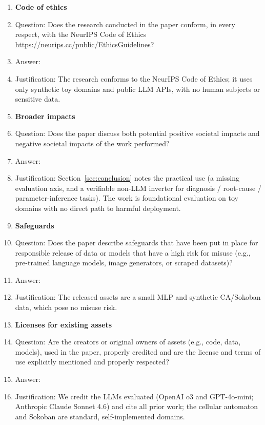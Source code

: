\begin{enumerate}
\item {\bf Code of ethics}
    \item[] Question: Does the research conducted in the paper conform, in every respect, with the NeurIPS Code of Ethics \url{https://neurips.cc/public/EthicsGuidelines}?
    \item[] Answer: \answerYes{}
    \item[] Justification: The research conforms to the NeurIPS Code of Ethics; it uses only synthetic toy domains and public LLM APIs, with no human subjects or sensitive data.

\item {\bf Broader impacts}
    \item[] Question: Does the paper discuss both potential positive societal impacts and negative societal impacts of the work performed?
    \item[] Answer: \answerYes{}
    \item[] Justification: Section~\ref{sec:conclusion} notes the practical use (a missing evaluation axis, and a verifiable non-LLM inverter for diagnosis / root-cause / parameter-inference tasks). The work is foundational evaluation on toy domains with no direct path to harmful deployment.

\item {\bf Safeguards}
    \item[] Question: Does the paper describe safeguards that have been put in place for responsible release of data or models that have a high risk for misuse (e.g., pre-trained language models, image generators, or scraped datasets)?
    \item[] Answer: \answerNA{}
    \item[] Justification: The released assets are a small MLP and synthetic CA/Sokoban data, which pose no misuse risk.

\item {\bf Licenses for existing assets}
    \item[] Question: Are the creators or original owners of assets (e.g., code, data, models), used in the paper, properly credited and are the license and terms of use explicitly mentioned and properly respected?
    \item[] Answer: \answerYes{}
    \item[] Justification: We credit the LLMs evaluated (OpenAI o3 and GPT-4o-mini; Anthropic Claude Sonnet 4.6) and cite all prior work; the cellular automaton and Sokoban are standard, self-implemented domains.


\end{enumerate}
